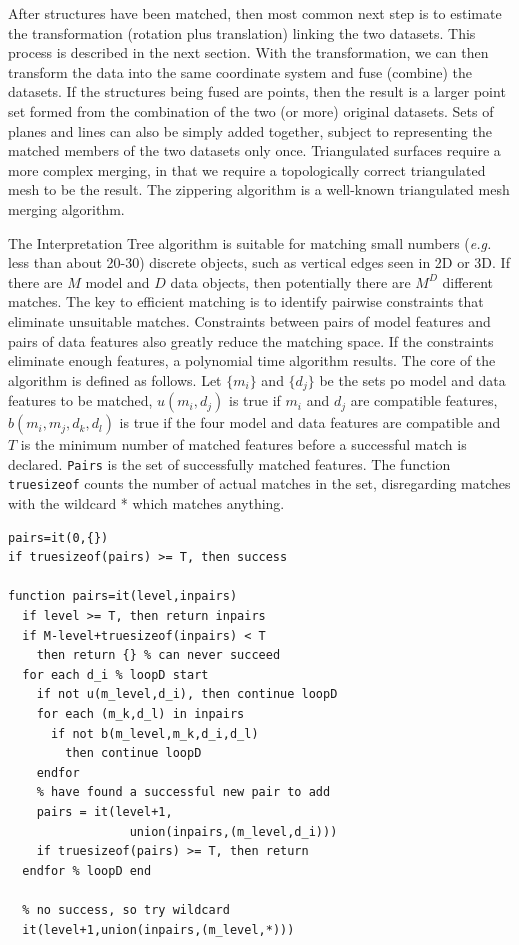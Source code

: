 \documentclass[twocolumn,oneside]{book}
\begin{document}
After structures have been matched, then most common next step is
to estimate the transformation (rotation plus translation) linking the
two datasets. This process is described in the next section.
With the transformation, we can then transform the data into the
same coordinate system and fuse (combine) the datasets.
If the structures being fused are points, then the result is a
larger point set formed from the combination of the two (or more) 
original datasets.
Sets of planes and lines can also be simply added together, subject to
representing the matched members of the two datasets only once.
Triangulated surfaces require a more complex merging, in that we require
a topologically correct triangulated mesh to be the result.
The zippering algorithm \cite{turk} is a well-known triangulated 
mesh merging algorithm.

The Interpretation Tree algorithm \cite{grimson} is suitable for matching
small numbers ({\it e.g.} less than about 20-30) discrete objects, such
as vertical edges seen in 2D or 3D. If there are $M$ model and $D$ data 
objects, then potentially there are $M^D$ different matches. 
The key to efficient matching is to identify pairwise constraints that
eliminate unsuitable matches.
Constraints between pairs of model features and pairs of data
features also greatly reduce the matching space. If the constraints
eliminate enough features, a polynomial time algorithm results.
The core of the algorithm is defined as follows.
Let $\{m_i\}$ and $\{d_j\}$ be the sets po model and data features to
be matched, $u(m_i,d_j)$ is true if $m_i$ and $d_j$ are compatible
features, $b(m_i,m_j,d_k,d_l)$ is true if the four model and data features
are compatible and $T$ is the minimum number of matched features before
a successful match is declared.
\verb+Pairs+ is the set of successfully matched features.
The function \verb+truesizeof+ counts the number of actual matches in the
set, disregarding matches with the wildcard * which matches anything.
\begin{verbatim}
pairs=it(0,{})
if truesizeof(pairs) >= T, then success

function pairs=it(level,inpairs)
  if level >= T, then return inpairs
  if M-level+truesizeof(inpairs) < T
    then return {} % can never succeed
  for each d_i % loopD start
    if not u(m_level,d_i), then continue loopD
    for each (m_k,d_l) in inpairs
      if not b(m_level,m_k,d_i,d_l)
        then continue loopD
    endfor
    % have found a successful new pair to add
    pairs = it(level+1,
                 union(inpairs,(m_level,d_i)))
    if truesizeof(pairs) >= T, then return
  endfor % loopD end

  % no success, so try wildcard  
  it(level+1,union(inpairs,(m_level,*)))
\end{verbatim}
\end{document}
